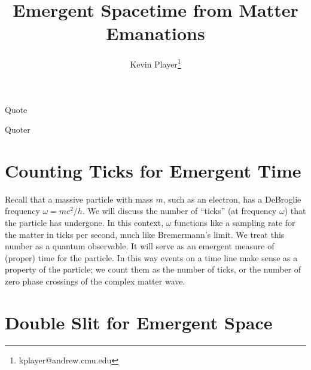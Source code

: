 \documentclass[12pt,a4paper]{article}
\begin{document}
\title{Emergent Spacetime from Matter Emanations}
\author[1]{Kevin Player\footnote{kplayer@andrew.cmu.edu}}

\maketitle

\epigraph{Quote}{Quoter}



 
\section{Counting Ticks for Emergent Time}

Recall that a massive particle with mass $m$, such as an electron, has a DeBroglie frequency $\omega = mc^2 / h$. We will discuss the number of ``ticks'' (at frequency $\omega$) that the particle has undergone. In this context, $\omega$ functions like a sampling rate for the matter in ticks per second, much like Bremermann's limit.  We treat this number as a quantum observable.  It will serve as an emergent measure of (proper) time for the particle.  In this way events on a time line make sense as a property of the particle; we count them as the number of ticks, or the number of zero phase crossings of the complex matter wave.

\section{Double Slit for Emergent Space}
\end{document}
